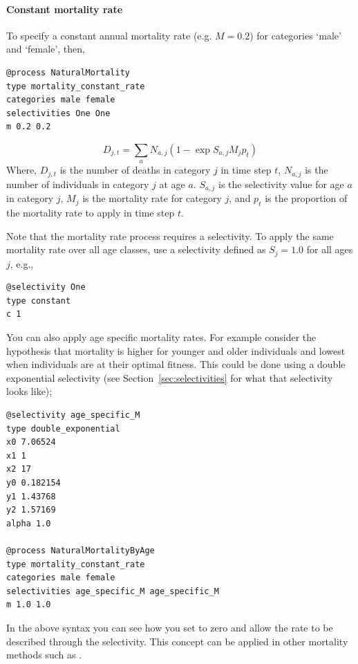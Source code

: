 \paragraph{Constant mortality rate}
To specify a constant annual mortality rate (e.g. $M=0.2$) for categories `male' and `female', then,
{\small{\begin{verbatim}
@process NaturalMortality
type mortality_constant_rate
categories male female
selectivities One One
m 0.2 0.2

\end{verbatim}}}

\begin{equation}
D_{j,t} = \sum_a N_{a,j} (1 - \exp{S_{a,j} M_j p_t})
\end{equation}
Where, $D_{j,t}$ is the number of deaths in category $j$ in time step $t$, $N_{a,j}$ is the number of individuals in category $j$ at age $a$. $S_{a,j}$ is the selectivity value for age $a$ in category $j$, $M_j$ is the mortality rate for category $j$, and $p_t$ is the proportion of the mortality rate to apply in time step $t$.

Note that the mortality rate process requires a selectivity. To apply the same mortality rate over all age classes, use a selectivity defined as $S_j=1.0$ for all ages $j$, e.g.,

{\small{\begin{verbatim}
@selectivity One
type constant
c 1
\end{verbatim}}}

You can also apply age specific mortality rates. For example consider the hypothesis that mortality is higher for younger and older individuals and lowest when individuals are at their optimal fitness. This could be done using a double exponential selectivity (see Section~\ref{sec:selectivities} for what that selectivity looks like);

{\small{\begin{verbatim}
@selectivity age_specific_M
type double_exponential
x0 7.06524
x1 1
x2 17
y0 0.182154
y1 1.43768
y2 1.57169
alpha 1.0

@process NaturalMortalityByAge
type mortality_constant_rate
categories male female
selectivities age_specific_M age_specific_M
m 1.0 1.0
\end{verbatim}}}

In the above syntax you can see how you set  to zero and allow the rate to be described through the selectivity. This concept can be applied in other mortality methods such as .
